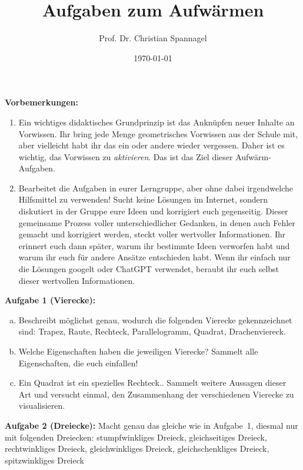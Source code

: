 \documentclass[12pt,a4paper,oneside,ngerman]{article}
\title{Aufgaben zum Aufwärmen}
\author{Prof. Dr. Christian Spannagel}
\date{\today}
\begin{document}
\pagestyle{fancy}
\begin{center}
\vspace*{5mm}
{\LARGE\textbf{\thetitle}}
\end{center}

\vspace*{10mm}

\textbf{Vorbemerkungen:} 
\begin{enumerate}
\item Ein wichtiges didaktisches Grundprinzip ist das Anknüpfen neuer Inhalte an Vorwissen. Ihr bring jede Menge geometrisches Vorwissen aus der Schule mit, aber vielleicht habt ihr das ein oder andere wieder vergessen. Daher ist es wichtig, das Vorwissen zu \emph{aktivieren}. Das ist das Ziel dieser Aufwärm-Aufgaben.
\item Bearbeitet die Aufgaben in eurer Lerngruppe, aber ohne dabei irgendwelche Hilfsmittel zu verwenden! Sucht keine Lösungen im Internet, sondern diskutiert in der Gruppe eure Ideen und korrigiert euch gegenseitig. Dieser gemeinsame Prozess voller unterschiedlicher Gedanken, in denen auch Fehler gemacht und korrigiert werden, steckt voller wertvoller Informationen. Ihr erinnert euch dann später, warum ihr bestimmte Ideen verworfen habt und warum ihr euch für andere Ansätze entschieden habt. Wenn ihr einfach nur die Lösungen googelt oder ChatGPT verwendet, beraubt ihr euch selbst dieser wertvollen Informationen.
\end{enumerate}

\vspace*{10mm}

\textbf{Aufgabe 1 (Vierecke):}  
\begin{enumerate}[a)]
\item Beschreibt möglichst genau, wodurch die folgenden Vierecke gekennzeichnet sind: Trapez, Raute, Rechteck, Parallelogramm, Quadrat, Drachenviereck.
\item Welche Eigenschaften haben die jeweiligen Vierecke? Sammelt alle Eigenschaften, die euch einfallen!
\item \glqq{}Ein Quadrat ist ein spezielles Rechteck.\grqq{}. Sammelt weitere Aussagen dieser Art und versucht einmal, den Zusammenhang der verschiedenen Vierecke zu visualisieren.
\end{enumerate}

\textbf{Aufgabe 2 (Dreiecke):} Macht genau das gleiche wie in Aufgabe~1, diesmal nur mit folgenden Dreiecken: stumpfwinkliges Dreieck, gleichseitiges Dreieck, rechtwinkliges Dreieck, gleichwinkliges Dreieck, gleichschenkliges Dreieck, spitzwinkliges Dreieck
\end{document}
